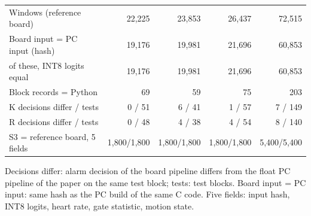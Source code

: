 \begin{table}[htbp]
{\begin{tabular}{lrrrr}
\midrule
Windows (reference board) & 22,225 & 23,853 & 26,437 & 72,515 \\
Board input = PC input (hash) & 19,176 & 19,981 & 21,696 & 60,853 \\
\quad of these, INT8 logits equal & 19,176 & 19,981 & 21,696 & 60,853 \\
Block records = Python & 69 & 59 & 75 & 203 \\
K decisions differ / tests & 0 / 51 & 6 / 41 & 1 / 57 & 7 / 149 \\
R decisions differ / tests & 0 / 48 & 4 / 38 & 4 / 54 & 8 / 140 \\
S3 = reference board, 5 fields & 1,800/1,800 & 1,800/1,800 & 1,800/1,800 & 5,400/5,400 \\
\bottomrule
\end{tabular}}
\par\smallskip\begin{minipage}{0.95\linewidth}\scriptsize Decisions differ: alarm decision of the board pipeline differs from the float PC pipeline of the paper on the same test block; tests: test blocks. Board input = PC input: same hash as the PC build of the same C code. Five fields: input hash, INT8 logits, heart rate, gate statistic, motion state.\end{minipage}
\end{table}
